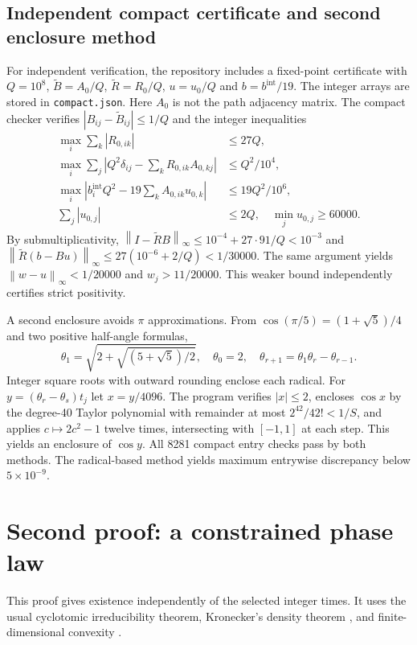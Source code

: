 \documentclass[11pt,a4paper]{article}
\newcommand{\norm}[1]{\left\lVert #1\right\rVert_\infty}
\begin{document}
\subsection{Independent compact certificate and second enclosure method}
For independent verification, the repository includes a fixed-point certificate with $Q=10^8$, $\widetilde B=A_0/Q$, $\widetilde R=R_0/Q$, $u=u_0/Q$ and $b=b^{\mathrm{int}}/19$. The integer arrays are stored in \texttt{compact.json}. Here $A_0$ is not the path adjacency matrix. The compact checker verifies $|B_{ij}-\widetilde B_{ij}|\le1/Q$ and the integer inequalities
\begin{align*}
\max_i\sum_k|R_{0,ik}|&\le27Q,\\
\max_i\sum_j|Q^2\delta_{ij}-\sum_kR_{0,ik}A_{0,kj}|&\le Q^2/10^4,\\
\max_i|b_i^{\mathrm{int}}Q^2-19\sum_k A_{0,ik}u_{0,k}|&\le 19Q^2/10^6,\\
\sum_j |u_{0,j}|&\le2Q,\quad\min_j u_{0,j}\ge60000.
\end{align*}
By submultiplicativity, $\norm{I-\widetilde R B}\le10^{-4}+27\cdot91/Q<10^{-3}$ and $\norm{\widetilde R(b-Bu)}\le27(10^{-6}+2/Q)<1/30000$. The same argument yields $\norm{w-u}<1/20000$ and $w_j>11/20000$. This weaker bound independently certifies strict positivity.

A second enclosure avoids $\pi$ approximations. From $\cos(\pi/5)=(1+\sqrt5)/4$ and two positive half-angle formulas,
\[
\theta_1=\sqrt{2+\sqrt{(5+\sqrt5)/2}},\quad \theta_0=2,\quad\theta_{r+1}=\theta_1\theta_r-\theta_{r-1}.
\]
Integer square roots with outward rounding enclose each radical. For $y=(\theta_r-\theta_s)t_j$ let $x=y/4096$. The program verifies $|x|\le2$, encloses $\cos x$ by the degree-40 Taylor polynomial with remainder at most $2^{42}/42!<1/S$, and applies $c\mapsto2c^2-1$ twelve times, intersecting with $[-1,1]$ at each step. This yields an enclosure of $\cos y$. All 8281 compact entry checks pass by both methods. The radical-based method yields maximum entrywise discrepancy below $5\times10^{-9}$.
\section{Second proof: a constrained phase law}
This proof gives existence independently of the selected integer times. It uses the usual cyclotomic irreducibility theorem, Kronecker's density theorem \cite{hardy}, and finite-dimensional convexity \cite{rock}.
\end{document}
